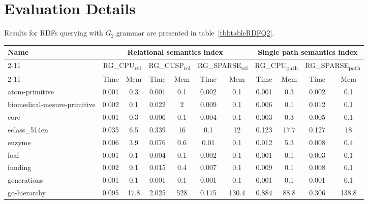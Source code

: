\section{Evaluation Details}

Results for RDFs querying with $G_2$ grammar are presented in table~\ref{tbl:tableRDFQ2}.

{\setlength{\tabcolsep}{0.4em}
\begin{table*}[h]
\caption{RDFs query $G_2$}
\label{tbl:tableRDFQ2}
\begin{tabular}{| l | c  c | c  c | c  c | c  c | c  c |}
    \hline

    \multirow{3}{*}{Name}   &   \multicolumn{6}{|c|}{Relational semantics index}	&	\multicolumn{4}{|c|}{Single path semantics index} \\
    \cline{2-11}
    &	\multicolumn{2}{|c|}{RG\_CPU\textsubscript{rel}}	&	\multicolumn{2}{|c|}{RG\_CUSP\textsubscript{rel}}	&	\multicolumn{2}{|c|}{RG\_SPARSE\textsubscript{rel}} &	\multicolumn{2}{|c|}{RG\_CPU\textsubscript{path}}	&	\multicolumn{2}{|c|}{RG\_SPARSE\textsubscript{path}}	 \\
    \cline{2-11}
    &   Time & Mem &  Time     & Mem & Time     & Mem  &  Time     & Mem & Time     & Mem \\
    \hline
    \hline
    atom-primitive          & 0.001 & 0.3  & 0.001 & 0.1 & 0.002 & 0.1   & 0.001 & 0.3  & 0.002 & 0.1   \\
biomedical-mesure-primitive & 0.002 & 0.1  & 0.022 & 2   & 0.009 & 0.1   & 0.006 & 0.1  & 0.012 & 0.1   \\
core                        & 0.001 & 0.3  & 0.006 & 0.1 & 0.004 & 0.1   & 0.003 & 0.3  & 0.005 & 0.1   \\
eclass\_514en               & 0.035 & 6.5  & 0.339 & 16  & 0.1   & 12    & 0.123 & 17.7 & 0.127 & 18    \\
enzyme                      & 0.006 & 3.9  & 0.076 & 0.6 & 0.01  & 0.1   & 0.012 & 5.3  & 0.008 & 0.4   \\
foaf                        & 0.001 & 0.1  & 0.004 & 0.1 & 0.002 & 0.1   & 0.001 & 0.1  & 0.003 & 0.1   \\
funding                     & 0.002 & 0.1  & 0.015 & 0.4 & 0.007 & 0.1   & 0.009 & 0.1  & 0.008 & 0.1   \\
generations                 & 0.001 & 0.1  & 0.001 & 0.1 & 0.001 & 0.1   & 0.001 & 0.1  & 0.001 & 0.1   \\
go-hierarchy                & 0.095 & 17.8 & 2.025 & 528 & 0.175 & 130.4 & 0.884 & 88.8 & 0.306 & 138.8 \\

\end{tabular}
\end{table*}}

